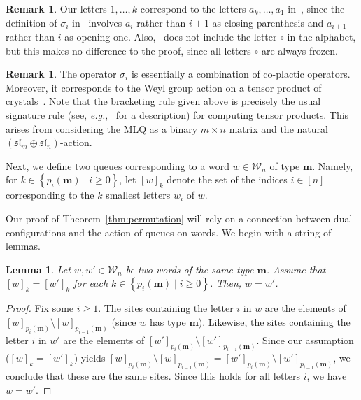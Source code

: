 \documentclass[reqno]{amsart}
\newcommand{\0}{\phantom{c}}
\newcommand{\mm}{\mathbf{m}}
\newcommand{\mcW}{\mathcal{W}}
\newcommand{\set}[1]{\left\{ #1 \right\}}
\newcommand{\ive}[1]{\left[ #1 \right]}
\theoremstyle{plain}
\newtheorem{lemma}[thm]{Lemma}
\theoremstyle{definition}
\newtheorem{remark}[thm]{Remark}
\numberwithin{equation}{section}
\newcommand{\travis}[1]{\todo[size=\tiny,color=blue!30]{#1 \\ \hfill --- Travis}}
\begin{document}
\begin{remark}
Our letters $1, \ldots, k$ correspond to the letters $a_k, \ldots, a_1$ in~\cite{Loth},
since the definition of $\sigma_i$ in~\cite{Loth} involves $a_i$ rather
than $i+1$ as closing parenthesis and $a_{i+1}$ rather than $i$ as opening one.
Also,~\cite{Loth} does not include the letter $\circ$ in the alphabet,
but this makes no difference to the proof, since all letters $\circ$ are always frozen.
\end{remark}

\begin{remark}
The operator $\sigma_i$ is essentially a combination of co-plactic operators.
Moreover, it corresponds to the Weyl group action on a tensor product of crystals~\cite{BS17}.
Note that the bracketing rule given above is precisely the usual signature rule (see, \textit{e.g.},~\cite[Sec.~2.4]{BS17} for a description) for computing tensor products.
This arises from considering the MLQ as a binary $m \times n$ matrix and the natural $(\mathfrak{sl}_m \oplus \mathfrak{sl}_n)$-action.
\end{remark}

Next, we define two queues corresponding to a word $w \in \mcW_n$ of type $\mm$.
Namely, for $k \in \set{p_i(\mm) \mid i \geq 0}$, let $[w]_k$ denote the set of the indices $i \in \ive{n}$
corresponding to the $k$ smallest letters $w_i$ of $w$.

Our proof of Theorem~\ref{thm:permutation} will rely on a connection between dual configurations and the action of queues on words.
We begin with a string of lemmas.

\begin{lemma} \label{lem:SL.reconstruct}
Let $w, w' \in \mcW_n$ be two words of the same type $\mm$.
Assume that $[w]_k = [w']_k$ for each $k \in \set{p_i(\mm) \mid i \geq 0}$.
Then, $w = w'$.
\end{lemma}

\begin{proof}
Fix some $i \geq 1$.
The sites containing the letter $i$ in $w$ are the elements of $[w]_{p_i(\mm)} \setminus [w]_{p_{i-1}(\mm)}$
(since $w$ has type $\mm$).
Likewise,
the sites containing the letter $i$ in $w'$ are the elements of $[w']_{p_i(\mm)} \setminus [w']_{p_{i-1}(\mm)}$.
Since our assumption ($[w]_k = [w']_k$) yields $[w]_{p_i(\mm)} \setminus [w]_{p_{i-1}(\mm)}
= [w']_{p_i(\mm)} \setminus [w']_{p_{i-1}(\mm)}$, %
we conclude that these are the same sites.
Since this holds for all letters $i$, we have $w = w'$.
\end{proof}
\end{document}
